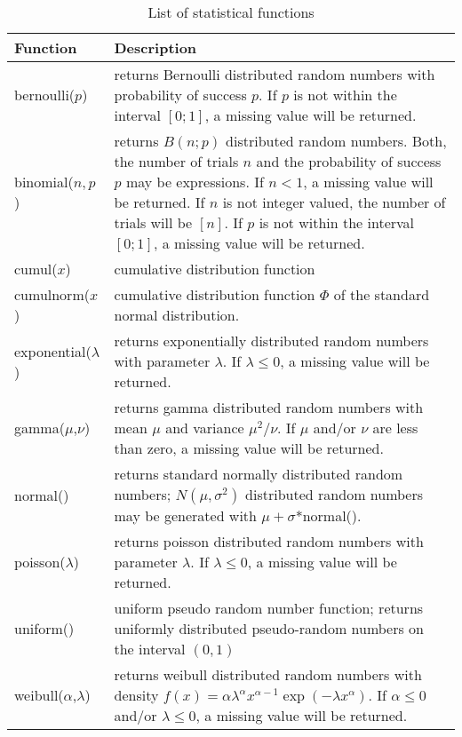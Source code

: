 \begin{table}[ht]
\begin{center}
\begin{tabular}{|l|p{11cm}|}
\hline
{\bf Function} & {\bf Description} \\
 \hline \hline
 bernoulli($p$) & returns Bernoulli distributed
 random numbers with probability of success $p$. If $p$ is not
 within the interval $[0;1]$, a
 missing value will be returned. \\
 \hline
 binomial($n,p$) & returns $B(n;p)$ distributed random
 numbers. Both, the number of trials $n$ and the probability of
 success $p$ may be expressions. If $n < 1$, a missing value will
 be returned. If $n$ is not integer valued, the number of trials
 will be $[n]$. If $p$ is not within the interval $[0;1]$, a
 missing value will be returned. \\
 \hline
 cumul($x$) & cumulative distribution function \\
 \hline
 cumulnorm($x$) & cumulative distribution function $\Phi$ of the standard normal distribution. \\
 \hline
 exponential($\lambda$) & returns exponentially distributed
 random numbers with parameter $\lambda$.
 If $\lambda \leq 0$, a missing value will be returned. \\
 \hline
 gamma($\mu$,$\nu$) & returns gamma distributed random
 numbers with mean $\mu$ and variance $\mu^2/ \nu$.
 If $\mu$ and/or $\nu$ are less than zero, a missing value will be returned.  \\
 \hline
 normal() & returns standard normally distributed random
 numbers;
 $N(\mu,\sigma^2)$ distributed random numbers may be generated with $\mu + \sigma$*normal(). \\
 \hline
 poisson($\lambda$) & returns poisson distributed random
 numbers with parameter $\lambda$.  If $\lambda \leq 0$, a missing value will be returned.\\
 \hline
 uniform() & uniform
 pseudo random number function; returns uniformly distributed
 pseudo-random numbers on the interval $(0,1)$ \\
 \hline
 weibull($\alpha$,$\lambda$) & returns weibull distributed
 random numbers with density
 $f(x)=\alpha\lambda^\alpha x^{\alpha-1}\exp(-\lambda x^\alpha)$.
 If $\alpha \leq 0$ and/or $\lambda \leq 0$, a missing value will be returned.\\
\hline
\end{tabular}
{\em \caption{\label{statfunc} List of statistical functions}}
\end{center}
\end{table}


